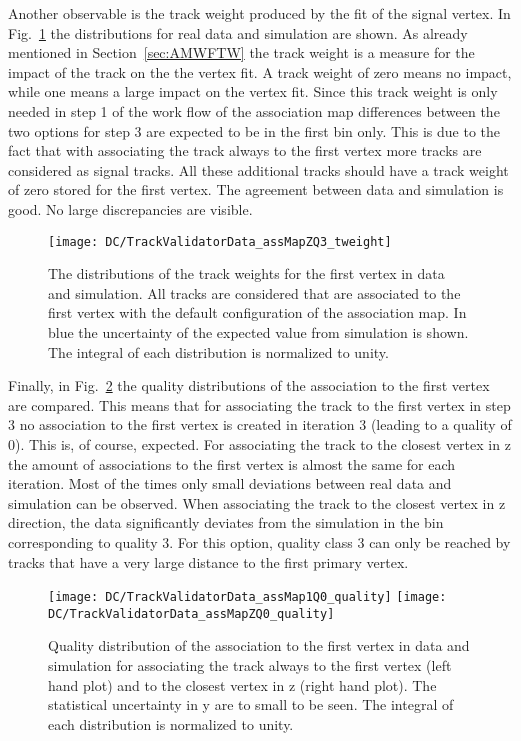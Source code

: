 Another observable is the track weight produced by the fit of the signal vertex. In Fig.~\ref{plot:DCTVTW} the distributions for real data and simulation are shown. As already mentioned in Section~\ref{sec:AMWFTW} the track weight is a measure for the impact of the track on the the vertex fit. A track weight of zero means no impact, while one means a large impact on the vertex fit. Since this track weight is only needed in step 1 of the work flow of the association map differences between the two options for step 3 are expected to be in the first bin only. This is due to the fact that with associating the track always to the first vertex more tracks are considered as signal tracks. All these additional tracks should have a track weight of zero stored for the first vertex. The agreement between data and simulation is good. No large discrepancies are visible.

\begin{figure}[Ht]
  \centering
  \texttt{[image: DC/TrackValidatorData\_assMapZQ3\_tweight]}
  \caption[Distribution of the track weights for the first vertex in data and simulation]{The distributions of the track weights for the first vertex in data and simulation. All tracks are considered that are associated to the first vertex with the default configuration of the association map. In blue the uncertainty of the expected value from simulation is shown. The integral of each distribution is normalized to unity. \label{plot:DCTVTW}}
\end{figure}

Finally, in Fig.~\ref{plot:DCTVTCQuality} the quality distributions of the association to the first vertex are compared. This means that for associating the track to the first vertex in step 3 no association to the first vertex is created in iteration 3 (leading to a quality of 0). This is, of course, expected. For associating the track to the closest vertex in z the amount of associations to the first vertex is almost the same for each iteration. Most of the times only small deviations between real data and simulation can be observed. When associating the track to the closest vertex in z direction, the data significantly deviates from the simulation in the bin corresponding to quality 3. For this option, quality class 3 can only be reached by tracks that have a very large distance to the first primary vertex.

\begin{figure}[Ht]
  \centering
  \texttt{[image: DC/TrackValidatorData\_assMap1Q0\_quality]}
  \texttt{[image: DC/TrackValidatorData\_assMapZQ0\_quality]}
  \caption[Quality distribution of the association to the first vertex in data and simulation]{Quality distribution of the association to the first vertex in data and simulation for associating the track always to the first vertex (left hand plot) and to the closest vertex in z (right hand plot). The statistical uncertainty in y are to small to be seen. The integral of each distribution is normalized to unity.\label{plot:DCTVTCQuality}}
\end{figure}


